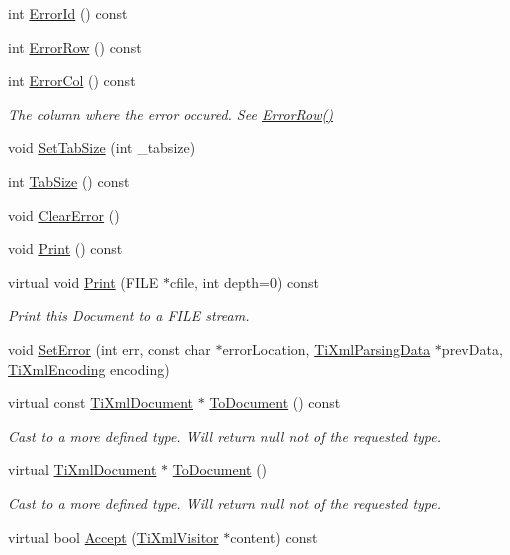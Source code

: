 \begin{DoxyCompactItemize}
int \hyperlink{class_ti_xml_document_abd928b49a646c8ed53e0453c555d96a2}{Error\+Id} () const
\item 
int \hyperlink{class_ti_xml_document_a062e5257128a7da31b0b2e38cd524600}{Error\+Row} () const
\item 
int \hyperlink{class_ti_xml_document_adea69de889449a2587afb8ee043f43f5}{Error\+Col} () const
\begin{DoxyCompactList}\small\item\em The column where the error occured. See \hyperlink{class_ti_xml_document_a062e5257128a7da31b0b2e38cd524600}{Error\+Row()} \end{DoxyCompactList}\item 
void \hyperlink{class_ti_xml_document_a51dac56316f89b35bdb7d0d433ba988e}{Set\+Tab\+Size} (int \+\_\+tabsize)
\item 
int \hyperlink{class_ti_xml_document_a81e6ffeee8f5d025a171eabf79abdad7}{Tab\+Size} () const
\item 
void \hyperlink{class_ti_xml_document_ac66b8c28db86363315712a3574e87c35}{Clear\+Error} ()
\item 
void \hyperlink{class_ti_xml_document_aa4e8c1498a76dcde7191c683e1220882}{Print} () const
\item 
virtual void \hyperlink{class_ti_xml_document_aa9e166fae51da603641380a964f21eeb}{Print} (F\+I\+LE $\ast$cfile, int depth=0) const
\begin{DoxyCompactList}\small\item\em Print this Document to a F\+I\+LE stream. \end{DoxyCompactList}\item 
void \hyperlink{class_ti_xml_document_a735c23e318597b920c94eae77fa206de}{Set\+Error} (int err, const char $\ast$error\+Location, \hyperlink{class_ti_xml_parsing_data}{Ti\+Xml\+Parsing\+Data} $\ast$prev\+Data, \hyperlink{tinyxml_8h_a88d51847a13ee0f4b4d320d03d2c4d96}{Ti\+Xml\+Encoding} encoding)
\item 
virtual const \hyperlink{class_ti_xml_document}{Ti\+Xml\+Document} $\ast$ \hyperlink{class_ti_xml_document_a468e582640e3c4f740f7168d8b4a6e4a}{To\+Document} () const
\begin{DoxyCompactList}\small\item\em Cast to a more defined type. Will return null not of the requested type. \end{DoxyCompactList}\item 
virtual \hyperlink{class_ti_xml_document}{Ti\+Xml\+Document} $\ast$ \hyperlink{class_ti_xml_document_a1025d942a1f328fd742d545e37efdd42}{To\+Document} ()
\begin{DoxyCompactList}\small\item\em Cast to a more defined type. Will return null not of the requested type. \end{DoxyCompactList}\item 
virtual bool \hyperlink{class_ti_xml_document_a8ddd6eec722cbd25900bbac664909bac}{Accept} (\hyperlink{class_ti_xml_visitor}{Ti\+Xml\+Visitor} $\ast$content) const
\end{DoxyCompactItemize}
